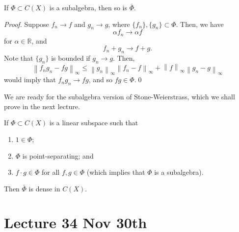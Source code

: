 \documentclass[notoc,notitlepage]{tufte-book}
\newcommand{\norm}[1]{\left\| #1 \right\|}
\begin{document}
\begin{lemma}\label{lemma:closure_of_a_subalgebra_is_a_subalgebra}
  If $\Phi \subset C(X)$ is a subalgebra, then so is $\bar{\Phi}$.
\end{lemma}

\begin{proof}
  Suppose $f_n \to f$ and $g_n \to g$, where $\{ f_n \}, \{ g_n \} \subset \Phi$. Then, we have
  \begin{equation*}
    \alpha f_n \to \alpha f
  \end{equation*}
  for $\alpha \in \mathbb{R}$, and
  \begin{equation*}
    f_n + g_n \to f + g.
  \end{equation*}
  Note that $\{ g_n \}$ is bounded if $g_n \to g$. Then,
  \begin{equation*}
    \norm{ f_n g_n - f g }_\infty \leq \norm{ g_n }_\infty \norm{ f_n - f }_\infty + \norm{ f }_\infty \norm{ g_n - g }_\infty
  \end{equation*}
  would imply that $f_n g_n \to fg$, and so $fg \in \Phi$.\qed\
\end{proof}

We are ready for the subalgebra version of Stone-Weierstrass, which we shall prove in the next lecture.

\begin{thmnonum}
  If $\Phi \subset C(X)$ is a linear subspace such that
  \begin{enumerate}
    \item $1 \in \Phi$;
    \item $\Phi$ is point-separating; and
    \item $f \cdot g \in \Phi$ for all $f, g \in \Phi$ (which implies that $\Phi$ is a subalgebra).
  \end{enumerate}
  Then $\bar{\Phi}$ is dense in $C(X)$.
\end{thmnonum}





\chapter{Lecture 34 Nov 30th}%
\label{chp:lecture_34_nov_30th}
\end{document}
